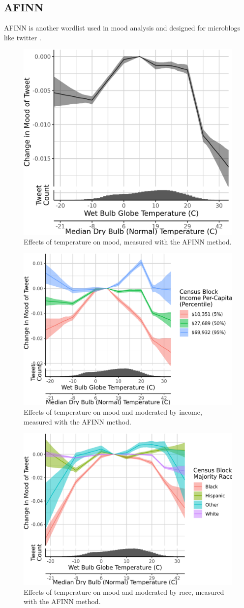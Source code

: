 \documentclass{article}
\begin{document}
\subsection{AFINN}

AFINN is another wordlist used in mood analysis and designed for microblogs like twitter \cite{nielsen2011new}.

\begin{figure}[H]
  \centering
  \includegraphics[width=0.6\linewidth]{../res/afinn-wbgt.png}
  \caption{Effects of temperature on mood, measured with the AFINN method.}
\end{figure}

\begin{figure}[H]
  \centering
  \includegraphics[width=0.6\linewidth]{../res/afinn-wbgt-income.png}
  \caption{Effects of temperature on mood and moderated by income, measured with the AFINN method.}
\end{figure}

\begin{figure}[H]
  \centering
  \includegraphics[width=0.6\linewidth]{../res/afinn-wbgt-race_q.png}
  \caption{Effects of temperature on mood and moderated by race, measured with the AFINN method.}
\end{figure}
\end{document}
